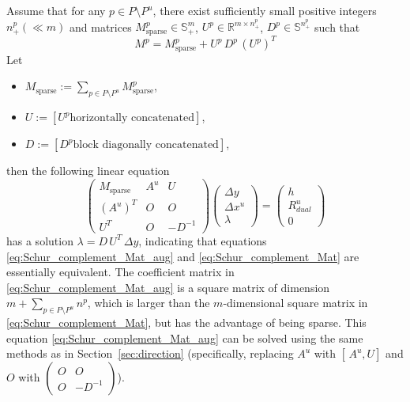 \documentclass{scrartcl}
\begin{document}
Assume that for any $p\in P\setminus P^u$, there exist sufficiently small positive integers $n^p_+(\ll m)$ and matrices $M^p_{\mathrm{sparse}} \in \mathbb{S}^m_+$, $U^p \in \mathbb{R}^{m\times n^p_+}$, $D^p\in \mathbb{S}^{n^p_+}$ such that
\begin{equation}
  M^p = M^p_{\mathrm{sparse}} + U^p\, D^p\, (U^p)^T
  \label{eq:low_rank_perturbation}
\end{equation}
Let 
\begin{itemize}
\item $M_{\mathrm{sparse}} := \sum_{p\in P\setminus P^u} M^p_{\mathrm{sparse}}$,
\item $U := [U^p \text{horizontally concatenated}]$, 
\item $D:=[D^p\text{block diagonally concatenated}]$,
\end{itemize}
then the following linear equation
\begin{equation}
  \begin{pmatrix}
    M_{\mathrm{sparse}} & A^u & U \\
    (A^u)^T & O & O \\
    U^T & O & -D^{-1}
  \end{pmatrix}
  \begin{pmatrix}
    \Delta y \\
    \Delta x^u \\
    \lambda
  \end{pmatrix}
  =
  \begin{pmatrix}
    h \\
    R^u_{dual} \\
    0
  \end{pmatrix}
  \label{eq:Schur_complement_Mat_aug}
\end{equation}
has a solution $\lambda = D\,U^T\,\Delta y$, indicating that equations \eqref{eq:Schur_complement_Mat_aug} and \eqref{eq:Schur_complement_Mat} are essentially equivalent.
The coefficient matrix in \eqref{eq:Schur_complement_Mat_aug} is a square matrix of dimension $m+\sum_{p\in P\setminus P^u} n^p$, which is larger than the $m$-dimensional square matrix in \eqref{eq:Schur_complement_Mat}, but has the advantage of being sparse.
This equation \eqref{eq:Schur_complement_Mat_aug} can be solved using the same methods as in Section~\ref{sec:direction}
(specifically, replacing $A^u$ with $[\,A^u, U]$ and $O$ with $\begin{pmatrix} O & O \\ O & -D^{-1} \end{pmatrix}$).
\end{document}
